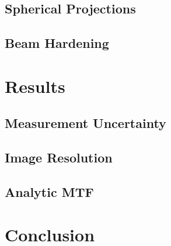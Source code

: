 \documentclass[
  twoside,
  11pt, a4paper,
  footinclude=true,
  headinclude=true,
  cleardoublepage=empty
]{scrbook}
\begin{document}
\section{Spherical Projections}
\section{Beam Hardening}
\chapter{Results}
\section{Measurement Uncertainty}
\section{Image Resolution}
\section{Analytic MTF}
\chapter{Conclusion}
\end{document}
